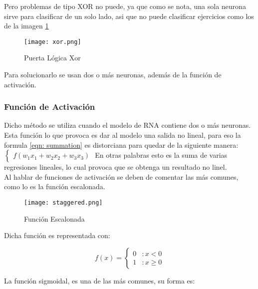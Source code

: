         Pero problemas de tipo XOR no puede, ya que como se nota, una sola neurona sirve para 
        clasificar de un solo lado, asi que no puede clasificar ejercicios
        como los de la imagen \ref{fig:fig3}

        \begin{figure}[H]
            \centering
            \texttt{[image: xor.png]}
            \caption{Puerta L\'ogica Xor \cite{mcmahon2014}}
            \label{fig:fig3}
        \end{figure}

        Para solucionarlo se usan dos o m\'as neuronas, adem\'as de la funci\'on de activaci\'on.

            \subsubsection{Funci\'on de Activaci\'on}
                Dicho m\'etodo se utiliza cuando el modelo de RNA contiene dos o m\'as neuronas.
                Esta funci\'on lo que provoca es dar al modelo una salida no lineal, para 
                eso la formula \eqref{eqn: summation} es distorciana para quedar de la siguiente 
                manera: 
                $\begin{cases}
                    f( w_1x_1 + w_2x_2 + w_3x_3 )
                \end{cases}$
                En otras palabras esto es la suma de varias regresiones lineales, lo cual provoca que se obtenga 
                un resultado no linel. \\
                Al hablar de funciones de activaci\'on se deben de comentar las m\'as comunes, como lo es la 
                funci\'on escalonada.
                
                \begin{figure}[H]
                    \centering
                    \texttt{[image: staggered.png]}
                    \caption{Funci\'on Escalonada}
                    \label{fig:fig4}
                \end{figure}

                Dicha funci\'on es representada con: 
                
                \[f(x) = \left\{ \begin{array}{lr} 0 & : x < 0\\ 1 & : x \ge 0 \end{array} \right. \]

                La funci\'on sigmoidal, es una de las m\'as comunes, su forma es: 

